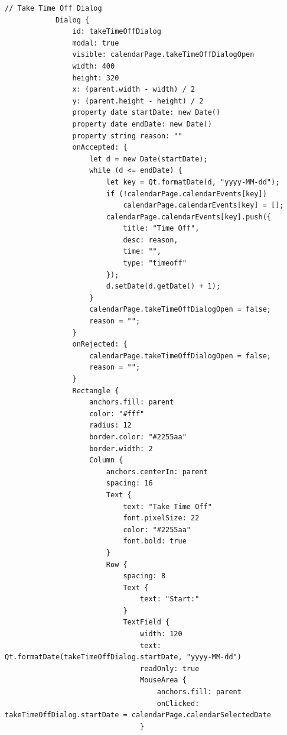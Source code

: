 \documentclass{report}
\begin{document}
\begin{lstlisting}[style=qmlstyle]
            // Take Time Off Dialog
            Dialog {
                id: takeTimeOffDialog
                modal: true
                visible: calendarPage.takeTimeOffDialogOpen
                width: 400
                height: 320
                x: (parent.width - width) / 2
                y: (parent.height - height) / 2
                property date startDate: new Date()
                property date endDate: new Date()
                property string reason: ""
                onAccepted: {
                    let d = new Date(startDate);
                    while (d <= endDate) {
                        let key = Qt.formatDate(d, "yyyy-MM-dd");
                        if (!calendarPage.calendarEvents[key])
                            calendarPage.calendarEvents[key] = [];
                        calendarPage.calendarEvents[key].push({
                            title: "Time Off",
                            desc: reason,
                            time: "",
                            type: "timeoff"
                        });
                        d.setDate(d.getDate() + 1);
                    }
                    calendarPage.takeTimeOffDialogOpen = false;
                    reason = "";
                }
                onRejected: {
                    calendarPage.takeTimeOffDialogOpen = false;
                    reason = "";
                }
                Rectangle {
                    anchors.fill: parent
                    color: "#fff"
                    radius: 12
                    border.color: "#2255aa"
                    border.width: 2
                    Column {
                        anchors.centerIn: parent
                        spacing: 16
                        Text {
                            text: "Take Time Off"
                            font.pixelSize: 22
                            color: "#2255aa"
                            font.bold: true
                        }
                        Row {
                            spacing: 8
                            Text {
                                text: "Start:"
                            }
                            TextField {
                                width: 120
                                text: Qt.formatDate(takeTimeOffDialog.startDate, "yyyy-MM-dd")
                                readOnly: true
                                MouseArea {
                                    anchors.fill: parent
                                    onClicked: takeTimeOffDialog.startDate = calendarPage.calendarSelectedDate
                                }

\end{lstlisting}
\end{document}
